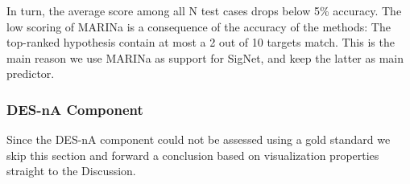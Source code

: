 In turn, the average score among all N test cases drops below 5\% accuracy. The low scoring of MARINa is a consequence of the accuracy of the methods: The top-ranked hypothesis contain at most a 2 out of 10 targets match. This is the main reason we use MARINa as support for SigNet, and keep the latter as main predictor.

\subsubsection{DES-nA Component}
Since the DES-nA component could not be assessed using a gold standard we skip this section and forward a conclusion based on visualization properties straight to the Discussion.